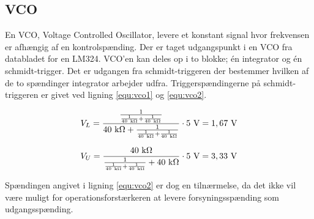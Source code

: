 \subsection*{VCO}
\label{volumenkontrol-simulering-vco}

En VCO, Voltage Controlled Oscillator, levere et konstant signal hvor frekvensen er afhængig af en kontrolspænding. Der er taget udgangspunkt i en VCO fra databladet for en LM324. VCO'en kan deles op i to blokke; én integrator og én schmidt-trigger. Det er udgangen fra schmidt-triggeren der bestemmer hvilken af de to spændinger integrator arbejder udfra. Triggerspændingerne på schmidt-triggeren er givet ved ligning \ref{equ:vco1} og \ref{equ:vco2}.

\begin{equation}
\label{equ:vco1}
V_L = \mathrm{\frac{\frac{1}{\frac{1}{40~k\ohm} + \frac{1}{40~k\ohm}}}{40~k\ohm + \frac{1}{\frac{1}{40~k\ohm} + \frac{1}{40~k\ohm}}} \cdot 5~V = 1,67~V}
\end{equation}

\begin{equation}
\label{equ:vco2}
V_U = \mathrm{\frac{40~k\ohm}{\frac{1}{\frac{1}{40~k\ohm} + \frac{1}{40~k\ohm}} + 40~k\ohm} \cdot 5~V = 3,33~V}
\end{equation}

Spændingen angivet i ligning \ref{equ:vco2} er dog en tilnærmelse, da det ikke vil være muligt for operationsforstærkeren at levere forsyningsspænding som udgangsspænding.